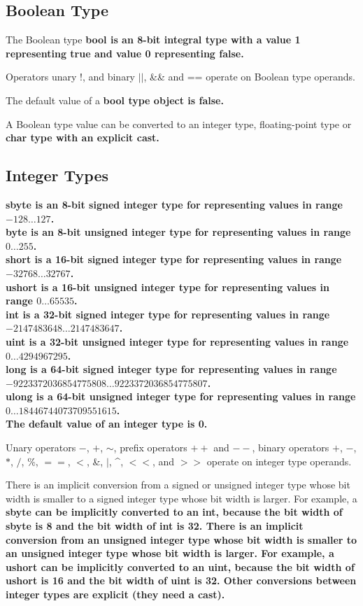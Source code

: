 \documentclass[a4paper,oneside,11pt]{article}
\begin{document}
\subsection{Boolean Type}

The Boolean type \bf{bool} is an 8-bit integral type with a value 1 representing \bf{true} and value 0 representing \bf{false}.

Operators unary !, and binary $||$, \&\& and == operate on Boolean type operands.

The default value of a \bf{bool} type object is \bf{false}.

A Boolean type value can be converted to an integer type, floating-point type or \bf{char} type with an explicit \bf{cast}.

\subsection{Integer Types}

\bf{sbyte} is an 8-bit signed integer type for representing values in range $-128 \ldots 127$.\\
\bf{byte} is an 8-bit unsigned integer type for representing values in range $0 \ldots 255$.\\
\bf{short} is a 16-bit signed integer type for representing values in range $-32768 \ldots 32767$.\\
\bf{ushort} is a 16-bit unsigned integer type for representing values in range $0 \ldots 65535$.\\
\bf{int} is a 32-bit signed integer type for representing values in range $-2147483648 \ldots 2147483647$.\\
\bf{uint} is a 32-bit unsigned integer type for representing values in range $0 \ldots 4294967295$.\\
\bf{long} is a 64-bit signed integer type for representing values in range\\
$-9223372036854775808 \ldots 9223372036854775807$.\\
\bf{ulong} is a 64-bit unsigned integer type for representing values in range $0 \ldots 18446744073709551615$.\\

The default value of an integer type is 0.

Unary operators $-$, $+$, $\sim$, prefix operators $++$ and $--$,
binary operators $+$, $-$, $*$, $/$, $\%$, $==$, $<$, \&, $|$, \^{}, $<<$, and $>>$ operate on integer type operands.

There is an implicit conversion from a signed or unsigned integer type whose bit width is smaller to a signed integer type whose bit width is larger.
For example, a \bf{sbyte} can be implicitly converted to an \bf{int}, because the bit width of \bf{sbyte} is 8 and the bit width of \bf{int} is 32.
There is an implicit conversion from an unsigned integer type whose bit width is smaller to an unsigned integer type whose bit width is larger.
For example, a \bf{ushort} can be implicitly converted to an \bf{uint}, because the bit width of \bf{ushort} is 16 and the bit width of \bf{uint} is 32.
Other conversions between integer types are explicit (they need a \bf{cast}).
\end{document}
